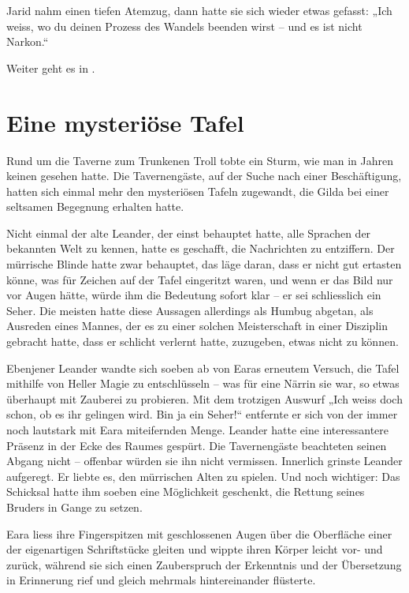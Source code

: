 Jarid nahm einen tiefen Atemzug, dann hatte sie sich wieder etwas gefasst: „Ich weiss, wo du deinen Prozess des Wandels beenden wirst – und es ist nicht Narkon.“

\begin{center}
    Weiter geht es in .
\end{center}




\newpage
\section{Eine mysteriöse Tafel}

Rund um die Taverne zum Trunkenen Troll tobte ein Sturm, wie man in Jahren keinen gesehen hatte. Die Tavernengäste, auf der Suche nach einer Beschäftigung, hatten sich einmal mehr den mysteriösen Tafeln zugewandt, die Gilda bei einer seltsamen Begegnung erhalten hatte.

Nicht einmal der alte Leander, der einst behauptet hatte, alle Sprachen der bekannten Welt zu kennen, hatte es geschafft, die Nachrichten zu entziffern. Der mürrische Blinde hatte zwar behauptet, das läge daran, dass er nicht gut ertasten könne, was für Zeichen auf der Tafel eingeritzt waren, und wenn er das Bild nur vor Augen hätte, würde ihm die Bedeutung sofort klar – er sei schliesslich ein Seher. Die meisten hatte diese Aussagen allerdings als Humbug abgetan, als Ausreden eines Mannes, der es zu einer solchen Meisterschaft in einer Disziplin gebracht hatte, dass er schlicht verlernt hatte, zuzugeben, etwas nicht zu können.

Ebenjener Leander wandte sich soeben ab von Earas erneutem Versuch, die Tafel mithilfe von Heller Magie zu entschlüsseln – was für eine Närrin sie war, so etwas überhaupt mit Zauberei zu probieren. Mit dem trotzigen Auswurf „Ich weiss doch schon, ob es ihr gelingen wird. Bin ja ein Seher!“ entfernte er sich von der immer noch lautstark mit Eara miteifernden Menge. Leander hatte eine interessantere Präsenz in der Ecke des Raumes gespürt. Die Tavernengäste beachteten seinen Abgang nicht – offenbar würden sie ihn nicht vermissen. Innerlich grinste Leander aufgeregt. Er liebte es, den mürrischen Alten zu spielen. Und noch wichtiger: Das Schicksal hatte ihm soeben eine Möglichkeit geschenkt, die Rettung seines Bruders in Gange zu setzen.



Eara liess ihre Fingerspitzen mit geschlossenen Augen über die Oberfläche einer der eigenartigen Schriftstücke gleiten und wippte ihren Körper leicht vor- und zurück, während sie sich einen Zauberspruch der Erkenntnis und der Übersetzung in Erinnerung rief und gleich mehrmals hintereinander flüsterte.

